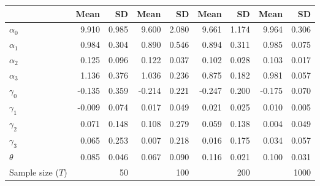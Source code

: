 
\begin{tabular}[t]{lrrrrrrrr}
\toprule
  & Mean & SD & Mean  & SD  & Mean   & SD   & Mean    & SD   \\
\midrule
$\alpha_{0}$ & 9.910 & 0.985 & 9.600 & 2.080 & 9.661 & 1.174 & 9.964 & 0.306\\
$\alpha_{1}$ & 0.984 & 0.304 & 0.890 & 0.546 & 0.894 & 0.311 & 0.985 & 0.075\\
$\alpha_{2}$ & 0.125 & 0.096 & 0.122 & 0.037 & 0.102 & 0.028 & 0.103 & 0.017\\
$\alpha_{3}$ & 1.136 & 0.376 & 1.036 & 0.236 & 0.875 & 0.182 & 0.981 & 0.057\\
$\gamma_{0}$ & -0.135 & 0.359 & -0.214 & 0.221 & -0.247 & 0.200 & -0.175 & 0.070\\
$\gamma_{1}$ & -0.009 & 0.074 & 0.017 & 0.049 & 0.021 & 0.025 & 0.010 & 0.005\\
$\gamma_{2}$ & 0.071 & 0.148 & 0.108 & 0.279 & 0.059 & 0.138 & 0.004 & 0.049\\
$\gamma_{3}$ & 0.065 & 0.253 & 0.007 & 0.218 & 0.016 & 0.175 & 0.034 & 0.057\\
$\theta$ & 0.085 & 0.046 & 0.067 & 0.090 & 0.116 & 0.021 & 0.100 & 0.031\\
Sample size ($T$) &  & 50 &  & 100 &  & 200 &  & 1000\\
\bottomrule
\end{tabular}
